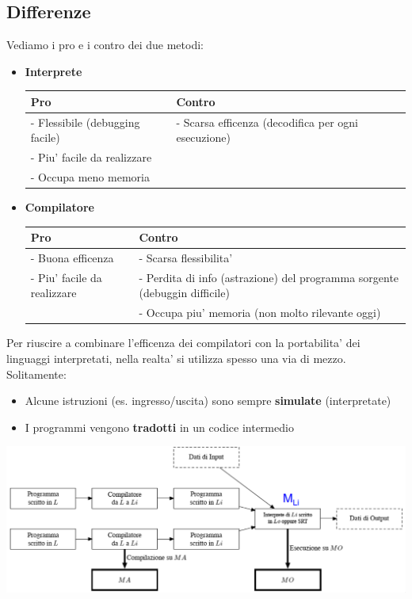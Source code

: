 \subsection{Differenze}
Vediamo i pro e i contro dei due metodi:
\begin{itemize}
  \item \textbf{Interprete}
    \begin{center}
      \begin{tabular}{ l | l  }
        Pro & Contro \\
        \hline
        - Flessibile (debugging facile) & - Scarsa efficenza (decodifica per ogni esecuzione) \\
        - Piu' facile da realizzare & \\
        - Occupa meno memoria & 
    \end{tabular}
    \end{center}
  \item \textbf{Compilatore}
    \begin{center}
      \begin{tabular}{ l | l  }
        Pro & Contro \\
        \hline
        - Buona efficenza & - Scarsa flessibilita' \\
        - Piu' facile da realizzare & - Perdita di info (astrazione) del programma sorgente (debuggin difficile) \\
        & - Occupa piu' memoria (non molto rilevante oggi) 
      \end{tabular}
    \end{center}
\end{itemize}

Per riuscire a combinare l'efficenza dei compilatori con la portabilita' dei linguaggi interpretati, nella realta' si utilizza spesso una via di mezzo. Solitamente:
\begin{itemize}
  \item Alcune istruzioni (es. ingresso/uscita) sono sempre \textbf{simulate} (interpretate)
  \item I programmi vengono \textbf{tradotti} in un codice intermedio
\end{itemize}

\begin{center}
  \includegraphics[scale=0.4]{img/2024-12-14-17-02-00.png}
\end{center}

